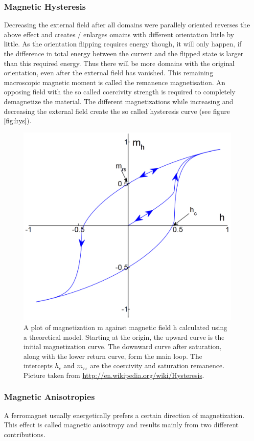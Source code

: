 \documentclass[a4paper]{scrartcl}
\numberwithin{equation}{section}
\numberwithin{figure}{section}
\numberwithin{table}{section}
\begin{document}
\subsubsection*{Magnetic Hysteresis}
Decreasing the external field after all domains were parallely oriented reverses the above effect and creates / enlarges omains with different orientation little by little. As the orientation flipping requires energy though, it will only happen, if the difference in total energy between the current and the flipped state is larger than this required energy. Thus there will be more domains with the original orientation, even after the external field has vanished. This remaining macroscopic magnetic moment is called the remanence magnetisation. An opposing field with the so called coercivity strength is required to completely demagnetize the material. The different magnetizations while increasing and decreasing the external field create the so called hysteresis curve (see figure \ref{fig:hys}).
\begin{figure}
        \begin{center}
         \includegraphics[width=0.31\linewidth]{img/hys.pdf}
        \end{center}
        \caption{
\small A plot of magnetization m against magnetic field h calculated using a theoretical model. Starting at the origin, the upward curve is the initial magnetization curve. The downward curve after saturation, along with the lower return curve, form the main loop. The intercepts $h_c$ and $m_{rs}$ are the coercivity and saturation remanence. Picture taken from \url{http://en.wikipedia.org/wiki/Hysteresis}.
        }
        \label{fig:doms}
\end{figure}


\subsubsection*{Magnetic Anisotropies}
A ferromagnet usually energetically prefers a certain direction of magnetization. This effect is called magnetic anisotropy and results mainly from two different contributions.
\end{document}
